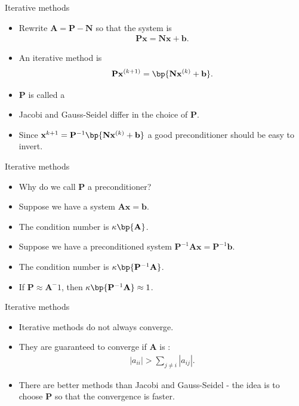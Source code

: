 \documentclass[11pt,xcolor={dvipsnames},aspectratio=159,hyperref={pdftex,pdfpagemode=UseNone,hidelinks,pdfdisplaydoctitle=true},usepdftitle=false]{beamer}
\begin{document}
\begin{frame}{Iterative methods}
    \begin{itemize}
        \item Rewrite $\mathbf{A} = \mathbf{P} - \mathbf{N}$ so that the system is \begin{align*}
            \mathbf{P}\mathbf{x} = \mathbf{N}\mathbf{x} + \mathbf{b}.
        \end{align*} 
        \item An iterative method is \begin{align*}
            \mathbf{P} \mathbf{x}^{(k+1)} = \bp{\mathbf{N}\mathbf{x}^{(k)} + \mathbf{b}}.
        \end{align*}
        \item $\mathbf{P}$ is called a 
        \item Jacobi and Gauss-Seidel differ in the choice of $\mathbf{P}$.
        \item Since $\mathbf{x}^{{k+1}} = \mathbf{P}^{-1}\bp{\mathbf{N}\mathbf{x}^{(k)} + \mathbf{b}}$ a good preconditioner should be easy to invert.
    \end{itemize}
    \end{frame}
    
    \begin{frame}{Iterative methods}
        \begin{itemize}
            \item Why do we call $\mathbf{P}$ a preconditioner?
            \item Suppose we have a system $\mathbf{A}\mathbf{x} = \mathbf{b}$.
            \item The condition number is $\kappa\bp{\mathbf{A}}$.
            \item Suppose we have a preconditioned system $\mathbf{P}^{-1}\mathbf{A}\mathbf{x} = \mathbf{P}^{-1}  \mathbf{b}$.
            \item The condition number is $\kappa\bp{\mathbf{P}^{-1}\mathbf{A}}$.
            \item If $\mathbf{P}\approx\mathbf{A}^-1$, then $\kappa\bp{\mathbf{P}^{-1}\mathbf{A}} \approx 1$.
        \end{itemize}
        \end{frame}
        
    \begin{frame}{Iterative methods}
        \begin{itemize}
            \item Iterative methods do not always converge.
            \item They are guaranteed to converge if $\mathbf{A}$ is : \begin{align*}
                |a_{ii}| > \sum_{j\neq i} |a_{ij}|. \end{align*}
                \item There are better methods than Jacobi and Gauss-Seidel - the idea is to choose $\mathbf{P}$ so that the convergence is faster.
            \end{itemize}

        \end{frame}
        
\end{document}
